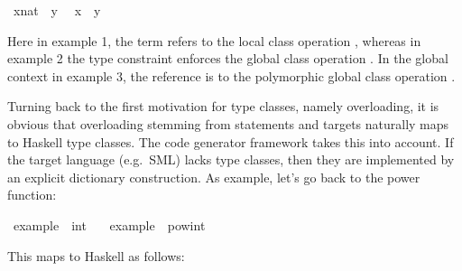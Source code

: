 \begin{isabellebody}
\isanewline
{}\isamarkupfalse%
\ {\isachardoublequoteopen}{\isacharparenleft}x{\isasymColon}nat{\isacharparenright}\ {\isasymotimes}\ y{\isachardoublequoteclose}\ %
\isanewline
\isanewline
{}\isamarkupfalse%
\isanewline
\isanewline
{}\isamarkupfalse%
\ {\isachardoublequoteopen}x\ {\isasymotimes}\ y{\isachardoublequoteclose}\ %
%
\endisatagquote
{\isafoldquote}%
%
\isadelimquote
%
\endisadelimquote
%
\begin{isamarkuptext}%
\noindent Here in example 1, the term refers to the local class operation
  , whereas in example 2 the type constraint
  enforces the global class operation .
  In the global context in example 3, the reference is
  to the polymorphic global class operation .%
\end{isamarkuptext}%
\isamarkuptrue%
%
\isamarkuptrue%
%
\isamarkuptrue%
%
\begin{isamarkuptext}%
Turning back to the first motivation for type classes,
  namely overloading, it is obvious that overloading
  stemming from \hyperlink{command.class}{\mbox{}} statements and
  \hyperlink{command.instantiation}{\mbox{}}
  targets naturally maps to Haskell type classes.
  The code generator framework \cite{isabelle-codegen} 
  takes this into account.  If the target language (e.g.~SML)
  lacks type classes, then they
  are implemented by an explicit dictionary construction.
  As example, let's go back to the power function:%
\end{isamarkuptext}%
\isamarkuptrue%
%
\isadelimquote
%
\endisadelimquote
%
\isatagquote
{}\isamarkupfalse%
\ example\ {\isacharcolon}{\isacharcolon}\ int\ \isanewline
\ \ {\isachardoublequoteopen}example\ {\isacharequal}\ pow{\isacharunderscore}int\ {}{}\ {\isacharparenleft}{\isacharminus}{}{\isacharparenright}{\isachardoublequoteclose}%
\endisatagquote
{\isafoldquote}%
%
\isadelimquote
%
\endisadelimquote
%
\begin{isamarkuptext}%
\noindent This maps to Haskell as follows:%
\end{isamarkuptext}%

\end{isabellebody}
